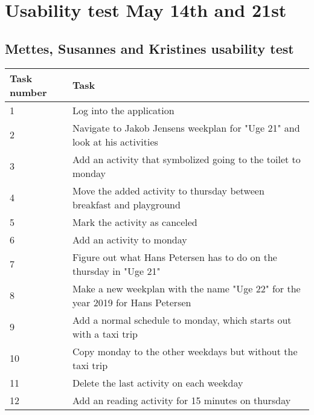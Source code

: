 \newpage
\chapter{Usability test May 14th and 21st}\label{usability-test-14-05}
\section{Mettes, Susannes and Kristines usability test}\label{usability-test-14-05-mette}
\begin{table}[H]
    \small
    \begin{tabular}{|p{1.3cm}|p{12cm}|}
    \hline
    Task number  &Task                                                                            \\ \hline
    1 & Log into the application                                                                           \\ \hline
    2 & Navigate to Jakob Jensens weekplan for "Uge 21" and look at his activities                   \\ \hline
    3 & Add an activity that symbolized going to the toilet to monday                                           \\ \hline
    4 & Move the added activity to thursday between breakfast and playground                         \\ \hline
    5 & Mark the activity as canceled                                                                 \\ \hline
    6 & Add an activity to monday                                                                      \\ \hline
    7 & Figure out what Hans Petersen has to do on the thursday in "Uge 21"                              \\ \hline
    8 & Make a new weekplan with the name "Uge 22" for the year 2019 for Hans Petersen                              \\ \hline
    9 & Add a normal schedule to monday, which starts out with a taxi trip                          \\ \hline
    10 & Copy monday to the other weekdays but without the taxi trip                                        \\ \hline
    11 & Delete the last activity on each weekday                                                        \\ \hline
    12 & Add an reading activity for 15 minutes on thursday                                              \\ \hline

\end{tabular}
\end{table}
